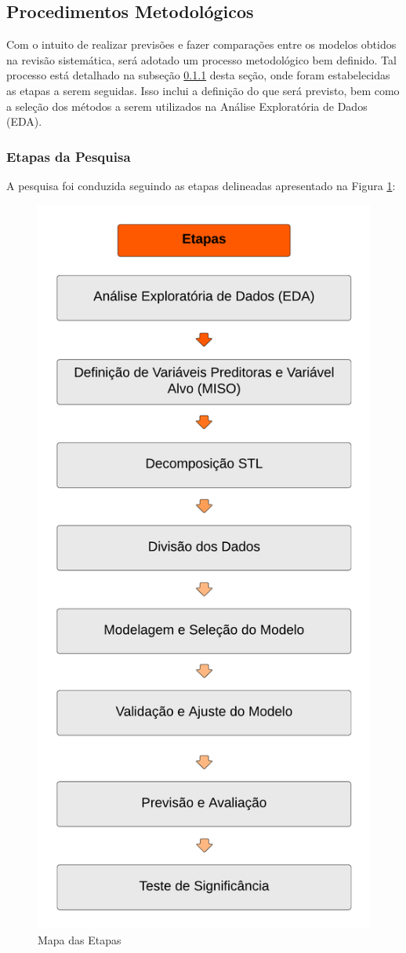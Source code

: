 

\subsection{Procedimentos Metodol{\'o}gicos} \label{subsec:metod}

Com o intuito de realizar previsões e fazer comparações entre os modelos obtidos na revisão sistemática, será adotado um processo metodológico bem definido. Tal processo está detalhado na subseção \ref{subsubsec:etp} desta seção, onde foram estabelecidas as etapas a serem seguidas. Isso inclui a definição do que será previsto, bem como a seleção dos métodos a serem utilizados na Análise Exploratória de Dados (EDA).
   

\subsubsection{Etapas da Pesquisa}\label{subsubsec:etp}

A pesquisa foi conduzida seguindo as etapas delineadas apresentado na Figura \ref{fig:etapas}:

\begin{figure}[!htb]
	\centering
	\caption{Mapa das Etapas}
	\label{fig:etapas}
	\includegraphics[width=0.4\linewidth]{Introducao/Figuras/Etapas}
	
	
\end{figure}

